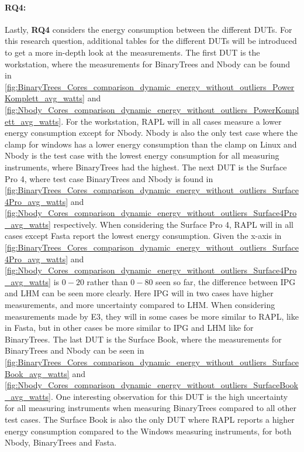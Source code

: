 


\paragraph*{RQ4:} Lastly, \textbf{RQ4} considers the energy consumption between the different DUTs. For this research question, additional tables for the different DUTs will be introduced to get a more in-depth look at the measurements. The first DUT is the workstation, where the measurements for BinaryTrees and Nbody can be found in \cref{fig:BinaryTrees_Cores_comparison_dynamic_energy_without_outliers_PowerKomplett_avg_watts} and \cref{fig:Nbody_Cores_comparison_dynamic_energy_without_outliers_PowerKomplett_avg_watts}. For the workstation, RAPL will in all cases measure a lower energy consumption except for Nbody. Nbody is also the only test case where the clamp for windows has a lower energy consumption than the clamp on Linux and Nbody is the test case with the lowest energy consumption for all measuring instruments, where BinaryTrees had the highest. The next DUT is the Surface Pro 4, where test case BinaryTrees and Nbody is found in \cref{fig:BinaryTrees_Cores_comparison_dynamic_energy_without_outliers_Surface4Pro_avg_watts} and \cref{fig:Nbody_Cores_comparison_dynamic_energy_without_outliers_Surface4Pro_avg_watts} respectively. When considering the Surface Pro 4, RAPL will in all cases except Fasta report the lowest energy consumption. Given the x-axis in \cref{fig:BinaryTrees_Cores_comparison_dynamic_energy_without_outliers_Surface4Pro_avg_watts} and \cref{fig:Nbody_Cores_comparison_dynamic_energy_without_outliers_Surface4Pro_avg_watts} is $0-20$ rather than $0-80$ seen so far, the difference between IPG and LHM can be seen more clearly. Here IPG will in two cases have higher measurements, and more uncertainty compared to LHM. When considering measurements made by E3, they will in some cases be more similar to RAPL, like in Fasta, but in other cases be more similar to IPG and LHM like for BinaryTrees. The last DUT is the Surface Book, where the measurements for BinaryTrees and Nbody can be seen in \cref{fig:BinaryTrees_Cores_comparison_dynamic_energy_without_outliers_SurfaceBook_avg_watts} and \cref{fig:Nbody_Cores_comparison_dynamic_energy_without_outliers_SurfaceBook_avg_watts}. One interesting observation for this DUT is the high uncertainty for all measuring instruments when measuring BinaryTrees compared to all other test cases. The Surface Book is also the only DUT where RAPL reports a higher energy consumption compared to the Windows measuring instruments, for both Nbody, BinaryTrees and Fasta.



